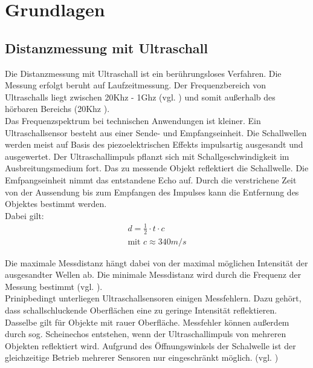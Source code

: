 \chapter{Grundlagen}
\section{Distanzmessung mit Ultraschall}
Die Distanzmessung mit Ultraschall ist ein berührungsloses Verfahren. Die Messung erfolgt beruht auf Laufzeitmessung. Der Frequenzbereich von Ultraschalls liegt zwischen 20Khz - 1Ghz (vgl. \cite{ultraschallbereich}) und somit außerhalb des hörbaren Bereichs (20Khz ). \\ Das Frequenzspektrum bei technischen Anwendungen ist kleiner. 
Ein Ultraschallsensor besteht aus einer Sende- und Empfangseinheit. Die Schallwellen werden meist auf Basis des piezoelektrischen Effekts impulsartig ausgesandt und ausgewertet.  Der Ultraschallimpuls pflanzt sich mit Schallgeschwindigkeit im Ausbreitungsmedium fort. Das zu messende Objekt reflektiert die Schallwelle. Die Emfpangseinheit nimmt das entstandene Echo auf. Durch die verstrichene Zeit von der Aussendung bis zum Empfangen des Impulses kann die Entfernung des Objektes bestimmt werden. \\

Dabei gilt:
\begin{align}
d = \frac{1}{2} \cdot t\cdot c\\
\text{mit }  c \approx 340m/s 
\end{align}

Die maximale Messdistanz hängt dabei von der maximal möglichen Intensität der ausgesandter Wellen ab. Die minimale Messdistanz wird durch die Frequenz der Messung bestimmt (vgl. \cite{ultraschallUni}). \\
Prinipbedingt unterliegen Ultraschallsensoren einigen Messfehlern. Dazu gehört, dass schallschluckende Oberflächen eine zu geringe Intensität reflektieren. Dasselbe gilt für Objekte mit rauer Oberfläche. Messfehler können außerdem durch sog. Scheinechos entstehen, wenn der Ultraschallimpuls von mehreren Objekten reflektiert wird. Aufgrund des Öffnungswinkels der Schalwelle ist der gleichzeitige Betrieb mehrerer Sensoren nur	 eingeschränkt möglich. (vgl. \cite{ultraschallBa})


